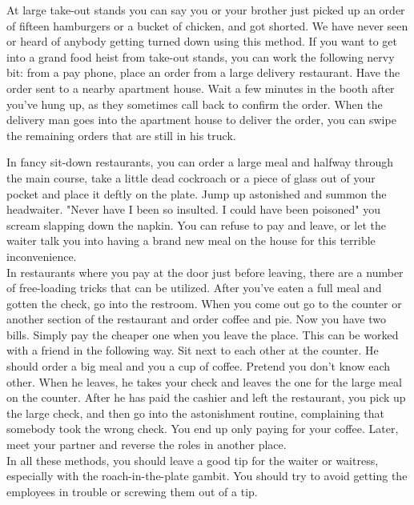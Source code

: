 \documentclass[11pt,twoside,a4paper]{book}
\begin{document}
At large take-out stands you can say you or your brother just picked up an order of fifteen hamburgers or a bucket of chicken, and got shorted. We have never seen or heard of anybody getting turned down using this method. If you want to get into a grand food heist from take-out stands, you can work the following nervy bit: from a pay phone, place an order from a large delivery restaurant. Have the order sent to a nearby apartment house. Wait a few minutes in the booth after you've hung up, as they sometimes call back to confirm the order. When the delivery man goes into the apartment house to deliver the order, you can swipe the remaining orders that are still in his truck.~\\

\clearpage

In fancy sit-down restaurants, you can order a large meal and halfway through the main course, take a little dead cockroach or a piece of glass out of your pocket and place it deftly on the plate. Jump up astonished and summon the headwaiter. "Never have I been so insulted. I could have been poisoned" you scream slapping down the napkin. You can refuse to pay and leave, or let the waiter talk you into having a brand new meal on the house for this terrible inconvenience.~\\

In restaurants where you pay at the door just before leaving, there are a number of free-loading tricks that can be utilized. After you've eaten a full meal and gotten the check, go into the restroom. When you come out go to the counter or another section of the restaurant and order coffee and pie. Now you have two bills. Simply pay the cheaper one when you leave the place. This can be worked with a friend in the following way. Sit next to each other at the counter. He should order a big meal and you a cup of coffee. Pretend you don't know each other. When he leaves, he takes your check and leaves the one for the large meal on the counter. After he has paid the cashier and left the restaurant, you pick up the large check, and then go into the astonishment routine, complaining that somebody took the wrong check. You end up only paying for your coffee. Later, meet your partner and reverse the roles in another place.~\\

In all these methods, you should leave a good tip for the waiter or waitress, especially with the roach-in-the-plate gambit. You should try to avoid getting the employees in trouble or screwing them out of a tip.~\\
\end{document}
